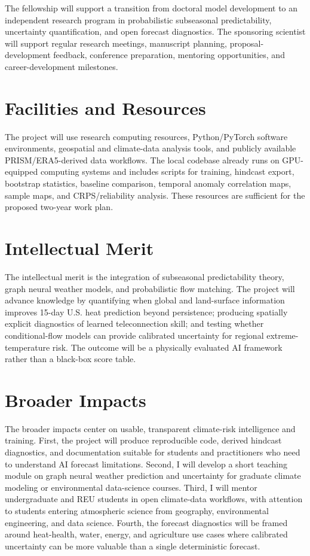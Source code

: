 \documentclass[11pt,letterpaper]{article}
\begin{document}
The fellowship will support a transition from doctoral model development to an independent research program in probabilistic subseasonal predictability, uncertainty quantification, and open forecast diagnostics. The sponsoring scientist will support regular research meetings, manuscript planning, proposal-development feedback, conference preparation, mentoring opportunities, and career-development milestones.

\section*{Facilities and Resources}
The project will use research computing resources, Python/PyTorch software environments, geospatial and climate-data analysis tools, and publicly available PRISM/ERA5-derived data workflows. The local codebase already runs on GPU-equipped computing systems and includes scripts for training, hindcast export, bootstrap statistics, baseline comparison, temporal anomaly correlation maps, sample maps, and CRPS/reliability analysis. These resources are sufficient for the proposed two-year work plan.

\section*{Intellectual Merit}
The intellectual merit is the integration of subseasonal predictability theory, graph neural weather models, and probabilistic flow matching. The project will advance knowledge by quantifying when global and land-surface information improves 15-day U.S. heat prediction beyond persistence; producing spatially explicit diagnostics of learned teleconnection skill; and testing whether conditional-flow models can provide calibrated uncertainty for regional extreme-temperature risk. The outcome will be a physically evaluated AI framework rather than a black-box score table.

\section*{Broader Impacts}
The broader impacts center on usable, transparent climate-risk intelligence and training. First, the project will produce reproducible code, derived hindcast diagnostics, and documentation suitable for students and practitioners who need to understand AI forecast limitations. Second, I will develop a short teaching module on graph neural weather prediction and uncertainty for graduate climate modeling or environmental data-science courses. Third, I will mentor undergraduate and REU students in open climate-data workflows, with attention to students entering atmospheric science from geography, environmental engineering, and data science. Fourth, the forecast diagnostics will be framed around heat-health, water, energy, and agriculture use cases where calibrated uncertainty can be more valuable than a single deterministic forecast.
\end{document}
